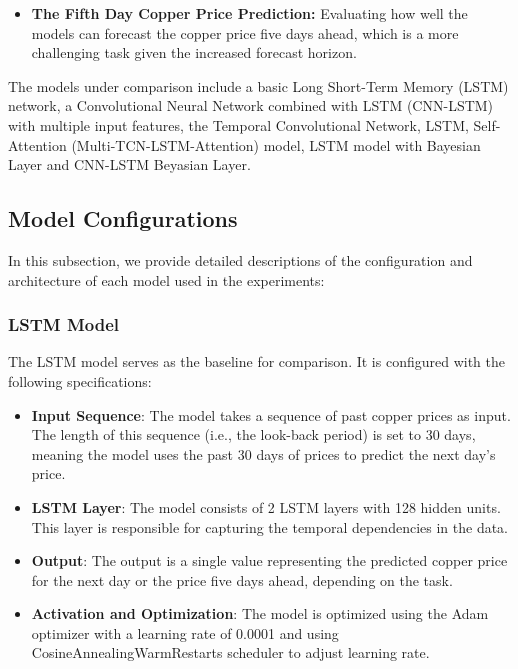 \documentclass[final-report]{report-template}
\begin{document}
\begin{itemize}
    \item \textbf{The Fifth Day Copper Price Prediction:} Evaluating how well the models can forecast the copper price five days ahead, which is a more challenging task given the increased forecast horizon.
\end{itemize}

The models under comparison include a basic Long Short-Term Memory (LSTM) network, a Convolutional Neural Network combined with LSTM (CNN-LSTM) with multiple input features, the Temporal Convolutional Network, LSTM, Self-Attention (Multi-TCN-LSTM-Attention) model, LSTM model with Bayesian Layer and CNN-LSTM Beyasian Layer.

\subsection{Model Configurations}
In this subsection, we provide detailed descriptions of the configuration and architecture of each model used in the experiments:

\subsubsection{\textbf{LSTM Model}}
The LSTM model serves as the baseline for comparison. It is configured with the following specifications:
\begin{itemize}
    \item \textbf{Input Sequence}: The model takes a sequence of past copper prices as input. The length of this sequence (i.e., the look-back period) is set to 30 days, meaning the model uses the past 30 days of prices to predict the next day’s price.
    \item \textbf{LSTM Layer}: The model consists of 2 LSTM layers with 128 hidden units. This layer is responsible for capturing the temporal dependencies in the data.
    \item \textbf{Output}: The output is a single value representing the predicted copper price for the next day or the price five days ahead, depending on the task.
    \item \textbf{Activation and Optimization}: The model is optimized using the Adam optimizer with a learning rate of 0.0001 and using CosineAnnealingWarmRestarts scheduler to adjust learning rate.
\end{itemize}
\end{document}
